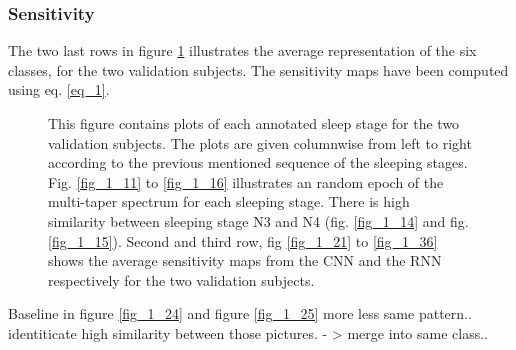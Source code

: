 \subsubsection{Sensitivity}

The two last rows in figure \ref{fig_1} illustrates the average representation of the six classes, for the two validation subjects. The sensitivity maps have been computed using eq. \ref{eq_1}.

\begin{figure*}[th!]
\centering

\caption{This figure contains plots of each annotated sleep stage for the two validation subjects. The plots are given columnwise from left to right according to the previous mentioned sequence of the sleeping stages. Fig. \ref{fig_1_11} to \ref{fig_1_16} illustrates an random epoch of the multi-taper spectrum for each sleeping stage. There is high similarity between sleeping stage N3 and N4 (fig. \ref{fig_1_14} and fig. \ref{fig_1_15}). Second and third row, fig \ref{fig_1_21} to \ref{fig_1_36} shows the average sensitivity maps from the CNN and the RNN respectively for the two validation subjects.}
\label{fig_1}
\end{figure*}

Baseline in figure \ref{fig_1_24} and figure \ref{fig_1_25} more less same pattern.. identiticate high similarity between those pictures. - > merge into same class..



